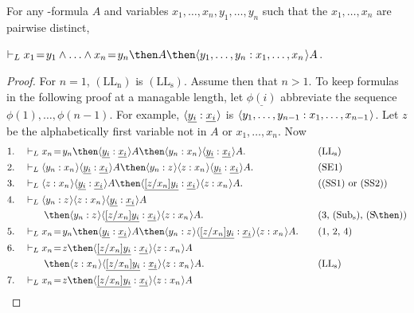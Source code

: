\documentclass[11pt]{woarticle}
\theoremstyle{break}
\theoremstyle{nonumberplain}
\newcommand{\1}{\;\,|\;\,}
\renewcommand{\t}[1]{\ensuremath{\langle #1  \makebox[.2ex]{}\rangle}}
\renewcommand{\vec}[1]{\ensuremath{\underline{#1}}}
\newcommand{\T}[1]{\ensuremath{(\mathrm{ #1})}}
\newcommand{\itemT}[1]{\item[\T{#1}]}
\begin{document}
\begin{lemma}
  For any -formula $A$ and variables
  $x_1,\ldots,x_n,y_1,\ldots,y_n$ such that the $x_1,\ldots,x_n$ are
  pairwise distinct,
  \begin{semantics}
    \itemT{LL_n} $\vdash_L x_1\!=\!y_1 \land \ldots \land x_n\!=\!y_n 
                 \then A \then \t{y_1,\ldots,y_n : x_1,\ldots,x_n}A$.
  \end{semantics}
\end{lemma}
\begin{proof} For $n=1$, \T{LL_n} is \T{LL_s}. Assume then that $n >
  1$. To keep formulas in the following proof at a managable length,
  let $\vec{\phi(i)}$ abbreviate the sequence
  $\phi(1),\ldots,\phi(n-1)$. For example, $\t{\vec{y_i}:\vec{x_i}}$ is
  $\t{y_1,\ldots,y_{n-1} : x_1,\ldots, x_{n-1}}$. Let $z$ be the
  alphabetically first variable not in $A$ or $x_1,\ldots,x_n$. Now
  \begin{alignat*}{2}
    1.\quad& \vdash_L x_n\!=\!y_n \then \t{\vec{y_i} : \vec{x_i}}A
             \then \t{y_n:x_n}\t{\vec{y_i} : \vec{x_i}}A.
      &\quad& \text{\T{LL_s}}\\
    2.\quad& \vdash_L \t{y_n:x_n}\t{\vec{y_i} : \vec{x_i}}A
             \then \t{y_n:z}\t{z:x_n}\t{\vec{y_i} : \vec{x_i}}A.
      && \text{\T{SE1}}\\
    3.\quad& \vdash_L \t{z:x_n}\t{\vec{y_i} : \vec{x_i}}A 
             \then \t{\vec{[z/x_n]y_i} : \vec{x_i}}\t{z:x_n}A.
       && \text{(\T{SS1} or \T{SS2})}\\
    4.\quad& \vdash_L \t{y_n:z}\t{z:x_n}\t{\vec{y_i} : \vec{x_i}}A &&\\[-0.2ex] 
           & \quad\quad \then \t{y_n:z}\t{\vec{[z/x_n]y_i} : \vec{x_i}}\t{z:x_n}A.
       && \text{(3, \T{Sub_s}, \T{S\!\then})}\\
    5.\quad& \vdash_L x_n\!=\!y_n \then \t{\vec{y_i} : \vec{x_i}}A 
             \then \t{y_n:z}\t{\vec{[z/x_n]y_i} : \vec{x_i}}\t{z:x_n}A.
       && \text{(1, 2, 4)}\\
    6.\quad& \vdash_L x_n\!=\!z \then
             \t{\vec{[z/x_n]y_i} : \vec{x_i}}\t{z:x_n}A &&\\[-0.2ex]
           & \quad\quad \then 
             \t{z:x_n}\t{\vec{[z/x_n]y_i} : \vec{x_i}}\t{z:x_n}A.
       && \text{\T{LL_s}}\\
    7.\quad& \vdash_L x_n\!=\!z \then
             \t{\vec{[z/x_n]y_i} : \vec{x_i}}\t{z:x_n}A &&\\[-0.2ex]

\end{alignat*}
\end{proof}
\end{document}
